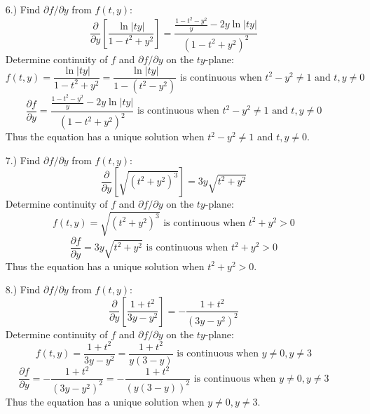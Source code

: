 \documentclass[12pt]{article}
\newcommand{\bracks}[1]{\left[#1\right]}
\begin{document}
\begin{itemize}
    \item [6.)] Find $\partial f/\partial y$ from $f(t,y)$:
    \[\frac{\partial}{\partial y}\bracks{\frac{\ln\vert ty\vert}{1-t^2+y^2}}=\frac{\frac{1-t^2-y^2}{y}-2y\ln\vert ty\vert}{(1-t^2+y^2)^2}\]
    Determine continuity of $f$ and $\partial f/\partial y$ on the $ty$-plane:
    \[f(t,y)=\frac{\ln\vert ty\vert}{1-t^2+y^2}=\frac{\ln\vert ty\vert}{1-(t^2-y^2)}\text{ is continuous when }t^2-y^2\neq1\text{ and }t,y\neq0\]
    \[\frac{\partial f}{\partial y}=\frac{\frac{1-t^2-y^2}{y}-2y\ln\vert ty\vert}{(1-t^2+y^2)^2}\text{ is continuous when } t^2-y^2\neq1\text{ and }t,y\neq0\]
    Thus the equation has a unique solution when $t^2-y^2\neq1$ and $t,y\neq0$.

    \pagebreak
    \item [7.)] Find $\partial f/\partial y$ from $f(t,y)$:
    \[\frac{\partial}{\partial y}\bracks{\sqrt{(t^2+y^2)^3}}=3y\sqrt{t^2+y^2}\]
    Determine continuity of $f$ and $\partial f/\partial y$ on the $ty$-plane:
    \[f(t,y)=\sqrt{(t^2+y^2)^3}\text{ is continuous when }t^2+y^2>0\]
    \[\frac{\partial f}{\partial y}=3y\sqrt{t^2+y^2}\text{ is continuous when }t^2+y^2>0\]
    Thus the equation has a unique solution when $t^2+y^2>0$.

    \item [8.)] Find $\partial f/\partial y$ from $f(t,y)$:
    \[\frac{\partial}{\partial y}\bracks{\frac{1+t^2}{3y-y^2}}=-\frac{1+t^2}{(3y-y^2)^2}\]
    Determine continuity of $f$ and $\partial f/\partial y$ on the $ty$-plane:
    \[f(t,y)=\frac{1+t^2}{3y-y^2}=\frac{1+t^2}{y(3-y)}\text{ is continuous when }y\neq0,y\neq3\]
    \[\frac{\partial f}{\partial y}=-\frac{1+t^2}{(3y-y^2)^2}=-\frac{1+t^2}{(y(3-y))^2}\text{ is continuous when }y\neq0,y\neq3\]
    Thus the equation has a unique solution when $y\neq0,y\neq3$.

\end{itemize}
\end{document}
